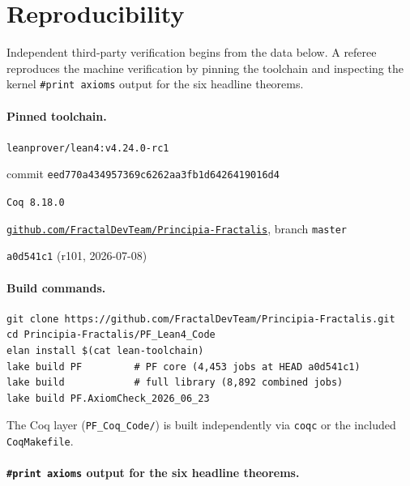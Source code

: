 \documentclass[11pt,a4paper]{amsart}
\theoremstyle{plain}
\theoremstyle{definition}
\begin{document}
\section{Reproducibility}\label{sec:reproducibility}

Independent third-party verification begins from the data below. A referee reproduces the machine verification by pinning the toolchain and inspecting the kernel \texttt{\#print axioms} output for the six headline theorems.

\paragraph{Pinned toolchain.}
\begin{description}[font=\normalfont\bfseries,leftmargin=2em,itemsep=2pt]
\item[Lean toolchain] \texttt{leanprover/lean4:v4.24.0-rc1}
\item[mathlib revision] commit \texttt{eed770a434957369c6262aa3fb1d6426419016d4}
\item[Coq version] \texttt{Coq 8.18.0}
\item[Repository] \href{https://github.com/FractalDevTeam/Principia-Fractalis}{\texttt{github.com/FractalDevTeam/Principia-Fractalis}}, branch \texttt{master}
\item[HEAD reference at submission] \texttt{a0d541c1} (r101, 2026-07-08)
\end{description}

\paragraph{Build commands.}
\begin{verbatim}
git clone https://github.com/FractalDevTeam/Principia-Fractalis.git
cd Principia-Fractalis/PF_Lean4_Code
elan install $(cat lean-toolchain)
lake build PF         # PF core (4,453 jobs at HEAD a0d541c1)
lake build            # full library (8,892 combined jobs)
lake build PF.AxiomCheck_2026_06_23
\end{verbatim}
The Coq layer (\texttt{PF\_Coq\_Code/}) is built independently via \texttt{coqc} or the included \texttt{CoqMakefile}.

\paragraph{\texttt{\#print axioms} output for the six headline theorems.}
\end{document}

